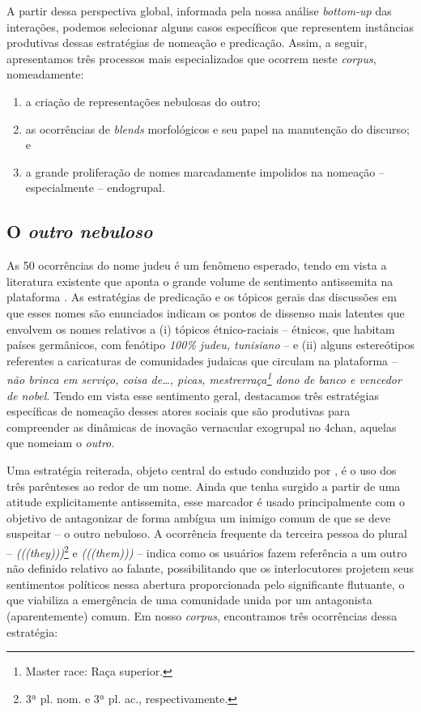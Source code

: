 \documentclass[portuguese]{textolivre}
\begin{document}
A partir dessa perspectiva global, informada pela nossa análise \emph{bottom-up} das interações, podemos selecionar alguns casos específicos que representem instâncias produtivas dessas estratégias de nomeação e predicação. Assim, a seguir, apresentamos três processos mais especializados que ocorrem neste \emph{corpus}, nomeadamente: 

\begin{enumerate}
    \item a criação de representações nebulosas do outro; 
    \item as ocorrências de \emph{blends} morfológicos e seu papel na manutenção do discurso; e 
    \item a grande proliferação de nomes marcadamente impolidos na nomeação – especialmente – endogrupal. 
\end{enumerate}


\subsection{O \emph{outro nebuloso}}

As 50 ocorrências do nome judeu é um fenômeno esperado, tendo em vista a literatura existente que aponta o grande volume de sentimento antissemita na plataforma \cite{nagle2017kill, tuters2018larping}. As estratégias de predicação e os tópicos gerais das discussões em que esses nomes são enunciados indicam os pontos de dissenso mais latentes que envolvem os nomes relativos a (i) tópicos étnico-raciais – étnicos, que habitam países germânicos, com fenótipo \emph{100\% judeu, tunisiano} – e (ii) alguns estereótipos referentes a caricaturas de comunidades judaicas que circulam na plataforma – \emph{não brinca em serviço, coisa de…, picas, mestrerraça\footnote{Master race: Raça superior.} dono de banco e vencedor de nobel}. Tendo em vista esse sentimento geral, destacamos três estratégias específicas de nomeação desses atores sociais que são produtivas para compreender as dinâmicas de inovação vernacular exogrupal no 4chan, aquelas que nomeiam o \emph{outro}.

Uma estratégia reiterada, objeto central do estudo conduzido por \cite{tutershagen2020they}, é o uso dos três parênteses ao redor de um nome. Ainda que tenha surgido a partir de uma atitude explicitamente antissemita, esse marcador é usado principalmente com o objetivo de antagonizar de forma ambígua um inimigo comum de que se deve suspeitar – o outro nebuloso. A ocorrência frequente da terceira pessoa do plural – \emph{(((they)))}\footnote{3ª pl. nom. e 3ª pl. ac., respectivamente.} e \emph{(((them)))} – indica como os usuários fazem referência a um outro não definido relativo ao falante, possibilitando que os interlocutores projetem seus sentimentos políticos nessa abertura proporcionada pelo significante flutuante, o que viabiliza a emergência de uma comunidade unida por um antagonista (aparentemente) comum. Em nosso \emph{corpus}, encontramos três ocorrências dessa estratégia:
\end{document}

